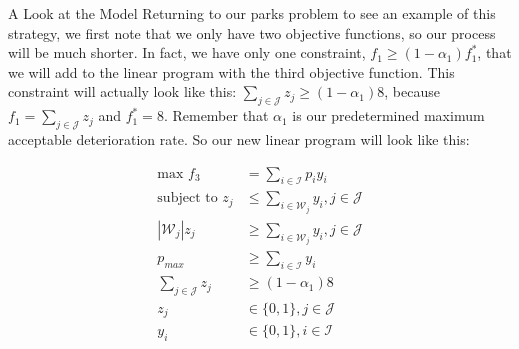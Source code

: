 \documentclass[12pt]{pom_thesis}
\theoremstyle{definition}
\begin{document}
\begin{chapter}{A Look at the Model}
Returning to our parks problem to see an example of this strategy, we first note that we only have two objective functions, so our process will be much shorter. In fact, we have only one constraint, $f_1 \geq (1-\alpha_1)f_1^*$, that we will add to the linear program with the third objective function. This constraint will actually look like this: $\sum_{j \in \mathcal{J}} z_j \geq (1-\alpha_1)8$, because $f_1 = \sum_{j \in \mathcal{J}} z_j$ and $f_1^* = 8$. Remember that $\alpha_1$ is our predetermined maximum acceptable deterioration rate. So our new linear program will look like this:

\begin{align*}
\textrm{max } f_3 &= \sum_{i \in \mathcal{I}} p_iy_i \\
\textrm{subject to } z_j &\leq \sum_{i \in \mathcal{W}_j} y_i, j \in \mathcal{J}\\
\left|\mathcal{W}_j\right|z_j &\geq \sum_{i \in \mathcal{W}_j} y_i, j \in \mathcal{J} \\
p_{max} &\geq \sum_{i \in \mathcal{I}} y_i  \\
\sum_{j \in \mathcal{J}} z_j &\geq (1-\alpha_1)8 \\
z_j &\in \{0,1\}, j \in \mathcal{J} \\
y_i &\in \{0,1\}, i \in \mathcal{I}
\end{align*}


\end{chapter}
\end{document}
